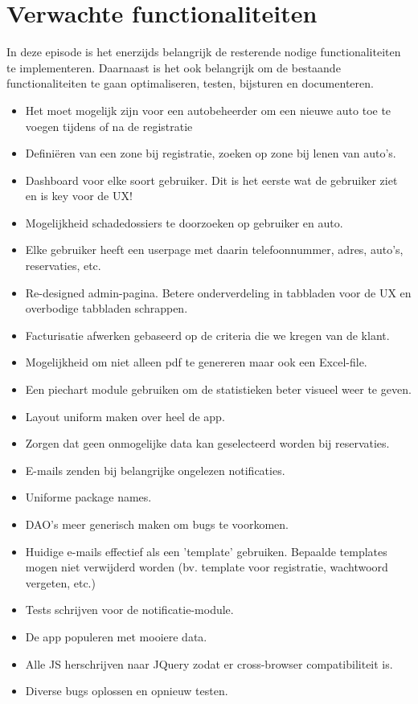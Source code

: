 \documentclass[11pt,a4paper,oneside]{article}
\begin{document}
\part{Verwachte functionaliteiten}
In deze episode is het enerzijds belangrijk de resterende nodige functionaliteiten te implementeren. Daarnaast is het ook belangrijk om de bestaande functionaliteiten te gaan optimaliseren, testen, bijsturen en documenteren.
\begin{itemize}
	\item Het moet mogelijk zijn voor een autobeheerder om een nieuwe auto toe te voegen tijdens of na de registratie
	\item Defini\"eren van een zone bij registratie, zoeken op zone bij lenen van auto's.
	\item Dashboard voor elke soort gebruiker. Dit is het eerste wat de gebruiker ziet en is key voor de UX!
	\item Mogelijkheid schadedossiers te doorzoeken op gebruiker en auto.
	\item Elke gebruiker heeft een userpage met daarin telefoonnummer, adres, auto's, reservaties, etc.
		\item   Re-designed admin-pagina. Betere onderverdeling in tabbladen voor de UX en overbodige tabbladen schrappen.
	\item Facturisatie afwerken gebaseerd op de criteria die we kregen van de klant.
	\item Mogelijkheid om niet alleen pdf te genereren maar ook een Excel-file.
	\item Een piechart module gebruiken om de statistieken beter visueel weer te geven.
	\item Layout uniform maken over heel de app.
	\item Zorgen dat geen onmogelijke data kan geselecteerd worden bij reservaties.
	\item E-mails zenden bij belangrijke ongelezen notificaties.
	\item Uniforme package names.
	\item DAO's meer generisch maken om bugs te voorkomen.
	\item Huidige e-mails effectief als een 'template' gebruiken. Bepaalde templates mogen niet verwijderd worden (bv. template voor registratie, wachtwoord vergeten, etc.)
	\item Tests schrijven voor de notificatie-module.
	\item De app populeren met mooiere data.
	\item Alle JS herschrijven naar JQuery zodat er cross-browser compatibiliteit is.
	\item Diverse bugs oplossen en opnieuw testen. 
	
\end{itemize}
\end{document}
